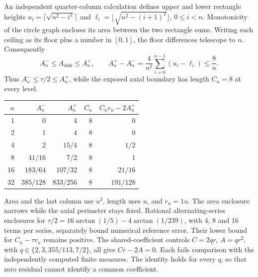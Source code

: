 An independent quarter-column calculation defines upper and lower
rectangle heights
\(u_i=\lceil\sqrt{n^2-i^2}\rceil\) and
\(\ell_i=\lfloor\sqrt{n^2-(i+1)^2}\rfloor\), \(0\le i<n\).
Monotonicity of the circle graph encloses its area between the two rectangle
sums. Writing each ceiling as its floor plus a number in \([0,1]\), the
floor differences telescope to \(n\). Consequently
\begin{equation}
 A_n^-\le A_{\mathrm{disk}}\le A_n^+,\qquad
 A_n^+-A_n^-=\frac{4}{n^2}\sum_{i=0}^{n-1}(u_i-\ell_i)
 \le \frac{8}{n}.
 \label{eq:m3-disk-enclosure}
\end{equation}
Thus \(A_n^-\leq\tau/2\leq A_n^+\),
while the exposed axial boundary has length \(C_n=8\) at every level.

\begin{center}
\begin{tabular}{rrrrr}
\toprule
\(n\)&\(A_n^-\)&\(A_n^+\)&\(C_n\)&\(C_n r_n-2A_n^+\)\\
\midrule
1&0&4&8&0\\
2&1&4&8&0\\
4&2&\(15/4\)&8&\(1/2\)\\
8&\(41/16\)&\(7/2\)&8&1\\
16&\(183/64\)&\(107/32\)&8&\(21/16\)\\
32&\(385/128\)&\(833/256\)&8&\(191/128\)\\
\bottomrule
\end{tabular}
\end{center}
Area and the last column use \(u^2\), length uses \(u\), and \(r_n=1u\).
The area enclosure narrows while the axial perimeter stays fixed.
Rational alternating-series enclosures for
\(\tau/2=16\arctan(1/5)-4\arctan(1/239)\), with 4, 8 and 16 terms per series,
separately bound numerical reference error. Their lower bound for
\(C_n-\tau r_n\) remains positive.
The shared-coefficient controls \(C=2qr\), \(A=qr^2\), with
\(q\in\{2,3,355/113,7/2\}\), all give \(Cr-2A=0\).
Each fails comparison with the independently computed finite measures.
The identity holds for every \(q\), so that zero residual cannot identify
a common coefficient.

